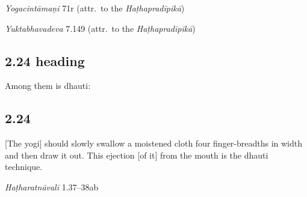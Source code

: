 \begin{ekdosis}
\begin{testimonia}[hp02_023]
\emph{Yogacintāmaṇi} 71r (attr.~to the \emph{Haṭhapradīpikā})

\begin{versinnote}
\end{versinnote}

\emph{Yuktabhavadeva} 7.149 (attr.~to the \emph{Haṭhapradīpikā})

\begin{versinnote}
\end{versinnote}

\end{testimonia}


\subsection*{2.24 heading}
\begin{translation}[hp02_024a]
Among them is dhauti:
\end{translation}


\subsection*{2.24}
\begin{translation}[hp02_024]
{[}The yogi] should slowly swallow a moistened cloth  four finger-breadths in width and then draw it out. This ejection [of it] from the mouth is the dhauti technique.
\end{translation}


\begin{testimonia}[hp02_024]
\emph{Haṭharatnāvalī} 1.37–38ab

\begin{versinnote}
\end{versinnote} 


\end{testimonia}
\end{ekdosis}
